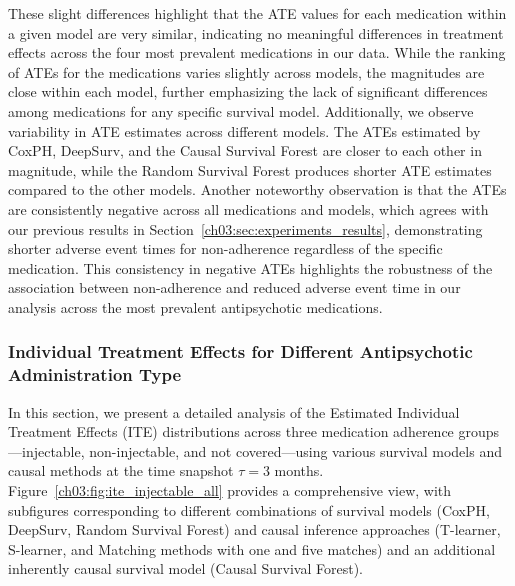 These slight differences highlight that the ATE values for each medication within a given model are very similar, indicating no meaningful differences in treatment effects across the four most prevalent medications in our data.
While the ranking of ATEs for the medications varies slightly across models, the magnitudes are close within each model, further emphasizing the lack of significant differences among medications for any specific survival model. 
Additionally, we observe variability in ATE estimates across different models. 
The ATEs estimated by CoxPH, DeepSurv, and the Causal Survival Forest are closer to each other in magnitude, while the Random Survival Forest produces shorter ATE estimates compared to the other models. 
Another noteworthy observation is that the ATEs are consistently negative across all medications and models, which agrees with our previous results in Section~\ref{ch03:sec:experiments_results}, demonstrating shorter adverse event times for non-adherence regardless of the specific medication. 
This consistency in negative ATEs highlights the robustness of the association between non-adherence and reduced adverse event time in our analysis across the most prevalent antipsychotic medications.

\subsubsection{Individual Treatment Effects for Different Antipsychotic Administration Type}
\label{ch03:apd:ite_injectable_all}






In this section, we present a detailed analysis of the Estimated Individual Treatment Effects (ITE) distributions across three medication adherence groups—injectable, non-injectable, and not covered—using various survival models and causal methods at the time snapshot \(\tau=3\) months.
Figure~\ref{ch03:fig:ite_injectable_all} provides a comprehensive view, with subfigures corresponding to different combinations of survival models (CoxPH, DeepSurv, Random Survival Forest) and causal inference approaches (T-learner, S-learner, and Matching methods with one and five matches) and an additional inherently causal survival model (Causal Survival Forest).

